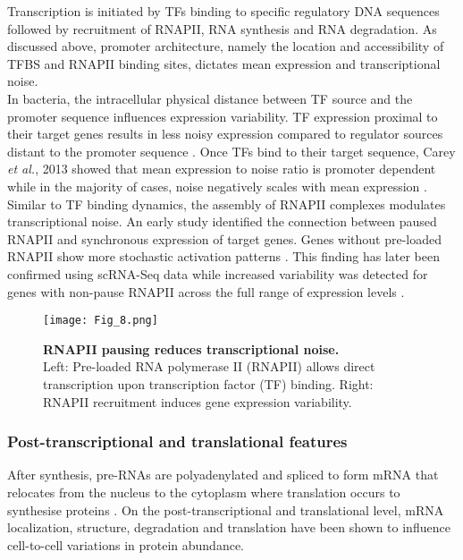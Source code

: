 Transcription is initiated by TFs binding to specific regulatory DNA sequences followed by recruitment of RNAPII, RNA synthesis and RNA degradation. As discussed above, promoter architecture, namely the location and accessibility of TFBS and RNAPII binding sites, dictates mean expression and transcriptional noise. \\

In bacteria, the intracellular physical distance between TF source and the promoter sequence influences expression variability. TF expression proximal to their target genes results in less noisy expression compared to regulator sources distant to the promoter sequence \citep{Goni-Moreno2017}. Once TFs bind to their target sequence, Carey \emph{et al.}, 2013 showed that mean expression to noise ratio is promoter dependent while in the majority of cases, noise negatively scales with mean expression \citep{Carey2013}. \\

Similar to TF binding dynamics, the assembly of RNAPII complexes modulates transcriptional noise. An early study identified the connection between paused RNAPII and synchronous expression of target genes. Genes without pre-loaded RNAPII show more stochastic activation patterns \citep{Boettiger2009}. This finding has later been confirmed using scRNA-Seq data while increased variability was detected for genes with non-pause RNAPII across the full range of expression levels \citep{Day2016}.\\

\begin{figure}[!h]
\centering
\texttt{[image: Fig\_8.png]}
\caption[RNAPII pausing reduces transcriptional noise]{\textbf{RNAPII pausing reduces transcriptional noise.}\\
Left: Pre-loaded RNA polymerase II (RNAPII) allows direct transcription upon transcription factor (TF) binding. Right: RNAPII recruitment induces gene expression variability.}
\label{fig0:DNA_features}
\end{figure} 

\newpage

\subsubsection{Post-transcriptional and translational features}

After synthesis, pre-RNAs are polyadenylated and spliced to form mRNA that relocates from the nucleus to the cytoplasm where translation occurs to synthesise proteins \cite{Glisovic2008}. On the post-transcriptional and translational level, mRNA localization, structure, degradation and translation have been shown to influence cell-to-cell variations in protein abundance.

